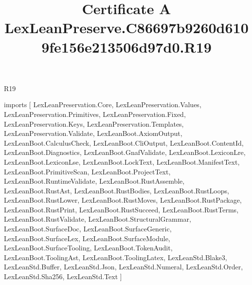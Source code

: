 \begin{lexlean}{R19}
\title{Certificate A LexLeanPreserve.C86697b9260d6109fe156e213506d97d0.R19}
\begin{coremodule}
imports [
  LexLeanPreservation.Core,
  LexLeanPreservation.Values,
  LexLeanPreservation.Primitives,
  LexLeanPreservation.Fixed,
  LexLeanPreservation.Keys,
  LexLeanPreservation.Templates,
  LexLeanPreservation.Validate,
  LexLeanBoot.AxiomOutput,
  LexLeanBoot.CalculusCheck,
  LexLeanBoot.CliOutput,
  LexLeanBoot.ContentId,
  LexLeanBoot.Diagnostics,
  LexLeanBoot.GnafValidate,
  LexLeanBoot.LexiconLre,
  LexLeanBoot.LexiconLse,
  LexLeanBoot.LockText,
  LexLeanBoot.ManifestText,
  LexLeanBoot.PrimitiveScan,
  LexLeanBoot.ProjectText,
  LexLeanBoot.RuntimeValidate,
  LexLeanBoot.RustAssemble,
  LexLeanBoot.RustAst,
  LexLeanBoot.RustBodies,
  LexLeanBoot.RustLoops,
  LexLeanBoot.RustLower,
  LexLeanBoot.RustMoves,
  LexLeanBoot.RustPackage,
  LexLeanBoot.RustPrint,
  LexLeanBoot.RustSucceed,
  LexLeanBoot.RustTerms,
  LexLeanBoot.RustValidate,
  LexLeanBoot.StructuralGrammar,
  LexLeanBoot.SurfaceDoc,
  LexLeanBoot.SurfaceGeneric,
  LexLeanBoot.SurfaceLex,
  LexLeanBoot.SurfaceModule,
  LexLeanBoot.SurfaceTooling,
  LexLeanBoot.TokenAudit,
  LexLeanBoot.ToolingAst,
  LexLeanBoot.ToolingLatex,
  LexLeanStd.Blake3,
  LexLeanStd.Buffer,
  LexLeanStd.Json,
  LexLeanStd.Numeral,
  LexLeanStd.Order,
  LexLeanStd.Sha256,
  LexLeanStd.Text
]


\end{coremodule}
\end{lexlean}
